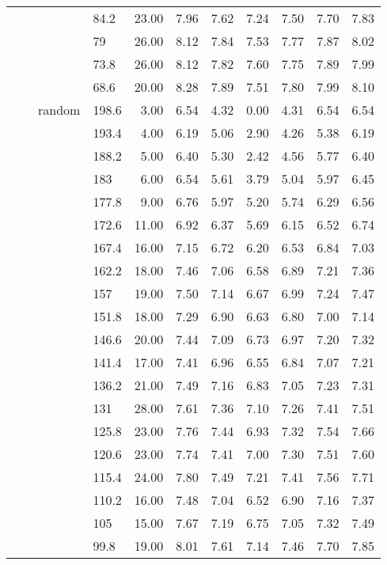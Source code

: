 \begin{longtable}{llllrrrrrrr}
   &  &  & 84.2 & 23.00 & 7.96 & 7.62 & 7.24 & 7.50 & 7.70 & 7.83 \\ 
   &  &  & 79 & 26.00 & 8.12 & 7.84 & 7.53 & 7.77 & 7.87 & 8.02 \\ 
   &  &  & 73.8 & 26.00 & 8.12 & 7.82 & 7.60 & 7.75 & 7.89 & 7.99 \\ 
   &  &  & 68.6 & 20.00 & 8.28 & 7.89 & 7.51 & 7.80 & 7.99 & 8.10 \\ 
   &  & random & 198.6 & 3.00 & 6.54 & 4.32 & 0.00 & 4.31 & 6.54 & 6.54 \\ 
   &  &  & 193.4 & 4.00 & 6.19 & 5.06 & 2.90 & 4.26 & 5.38 & 6.19 \\ 
   &  &  & 188.2 & 5.00 & 6.40 & 5.30 & 2.42 & 4.56 & 5.77 & 6.40 \\ 
   &  &  & 183 & 6.00 & 6.54 & 5.61 & 3.79 & 5.04 & 5.97 & 6.45 \\ 
   &  &  & 177.8 & 9.00 & 6.76 & 5.97 & 5.20 & 5.74 & 6.29 & 6.56 \\ 
   &  &  & 172.6 & 11.00 & 6.92 & 6.37 & 5.69 & 6.15 & 6.52 & 6.74 \\ 
   &  &  & 167.4 & 16.00 & 7.15 & 6.72 & 6.20 & 6.53 & 6.84 & 7.03 \\ 
   &  &  & 162.2 & 18.00 & 7.46 & 7.06 & 6.58 & 6.89 & 7.21 & 7.36 \\ 
   &  &  & 157 & 19.00 & 7.50 & 7.14 & 6.67 & 6.99 & 7.24 & 7.47 \\ 
   &  &  & 151.8 & 18.00 & 7.29 & 6.90 & 6.63 & 6.80 & 7.00 & 7.14 \\ 
   &  &  & 146.6 & 20.00 & 7.44 & 7.09 & 6.73 & 6.97 & 7.20 & 7.32 \\ 
   &  &  & 141.4 & 17.00 & 7.41 & 6.96 & 6.55 & 6.84 & 7.07 & 7.21 \\ 
   &  &  & 136.2 & 21.00 & 7.49 & 7.16 & 6.83 & 7.05 & 7.23 & 7.31 \\ 
   &  &  & 131 & 28.00 & 7.61 & 7.36 & 7.10 & 7.26 & 7.41 & 7.51 \\ 
   &  &  & 125.8 & 23.00 & 7.76 & 7.44 & 6.93 & 7.32 & 7.54 & 7.66 \\ 
   &  &  & 120.6 & 23.00 & 7.74 & 7.41 & 7.00 & 7.30 & 7.51 & 7.60 \\ 
   &  &  & 115.4 & 24.00 & 7.80 & 7.49 & 7.21 & 7.41 & 7.56 & 7.71 \\ 
   &  &  & 110.2 & 16.00 & 7.48 & 7.04 & 6.52 & 6.90 & 7.16 & 7.37 \\ 
   &  &  & 105 & 15.00 & 7.67 & 7.19 & 6.75 & 7.05 & 7.32 & 7.49 \\ 
   &  &  & 99.8 & 19.00 & 8.01 & 7.61 & 7.14 & 7.46 & 7.70 & 7.85 \\ 

\end{longtable}
